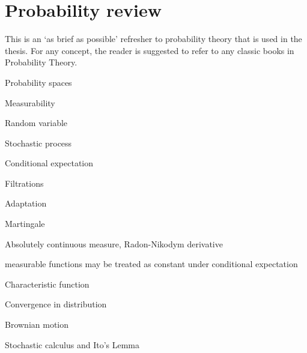 

\section{Probability review}
This is an `as brief as possible' refresher to probability theory that is used in the thesis. For any concept, the reader is suggested to refer to any classic books in Probability Theory.

Probability spaces

Measurability

Random variable

Stochastic process

Conditional expectation

Filtrations

Adaptation

Martingale

Absolutely continuous measure, Radon-Nikodym derivative

measurable functions may be treated as constant under conditional expectation

Characteristic function

Convergence in distribution

Brownian motion

Stochastic calculus and Ito's Lemma

